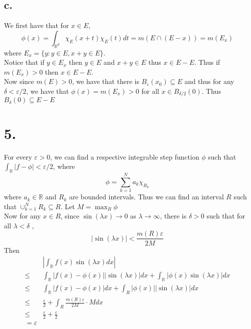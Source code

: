 \documentclass[11pt]{article}
\theoremstyle{mystyle}
\theoremstyle{definition}
\begin{document}
\subsection*{c.}
We first have that for $x \in E$,  
\[
  \phi(x) = \int_{\mathbb{R}^d} \chi_E(x+t) \chi_E(t) dt = m(E \cap (E - x)) = m(E_x)
\]
where $E_x = \{y: y \in E, x+y \in E\}$. \\
Notice that if $y \in E_x$ then $y \in E$ and $x+y\in E$ thus $x \in E-E$. Thus if $m(E_x) > 0$ then $x \in E - E$. \\
Now since $m(E)> 0$, we have that there is $B_\varepsilon(x_0) \subseteq E$ and thus for any $ \delta < \varepsilon/2$, we have that $\phi(x) = m(E_x) > 0$ for all $x \in B_{\delta/2}(0)$. Thus $B_\delta(0) \subseteq E-E$
\newpage
\section*{5.}
For every $\varepsilon > 0$, we can find a respective integrable step function $\phi$ such that $\int_\mathbb{R} |f - \phi| < \varepsilon/2$, where 
\[
  \phi = \sum_{k=1}^N a_k \chi_{R_k}
\]
where $a_k \in \mathbb{R}$ and $R_k$ are bounded intervals. Thus we can find an interval $R$ such that $\cup_{k=1}^N R_k \subseteq R$. Let $M = \max_R \phi$  \\
Now for any $x \in R$, since $\sin(\lambda x) \to 0$ as $\lambda \to \infty$, there is $\delta > 0$ such that for all $\lambda < \delta$ , 
\[
  |\sin(\lambda x)| < \displaystyle\frac{m(R) \varepsilon}{2M}
\]
Then 
\begin{align*}
  & \left|\int_\mathbb{R} f(x) \sin(\lambda x) dx \right| \\ 
  \le & \int_\mathbb{R} |f(x) - \phi(x)| |\sin(\lambda x)| dx + \int_\mathbb{R} |\phi(x) \sin(\lambda x)| dx \\
  \le & \int_\mathbb{R} |f(x) - \phi(x)| dx + \int_R |\phi(x)| |\sin(\lambda x)| dx \\
  \le &  \displaystyle\frac{\varepsilon}{2} + \int_R \displaystyle\frac{m(R) \varepsilon}{2M} \cdot M dx \\
  \le & \displaystyle\frac{\varepsilon}{2} + \displaystyle\frac{\varepsilon}{2} \\
  = \varepsilon
\end{align*}
\end{document}
